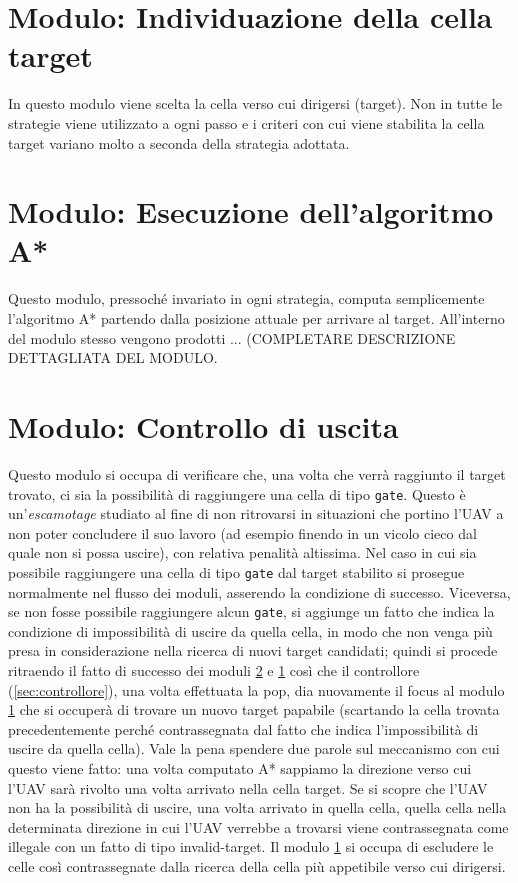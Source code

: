 \section{Modulo: Individuazione della cella target} \label{sec:target}
In questo modulo viene scelta la cella verso cui dirigersi (target). {\color{red} Non in tutte le strategie viene utilizzato a ogni passo} e i criteri con cui viene stabilita la cella target variano molto a seconda della strategia adottata.

\section{Modulo: Esecuzione dell'algoritmo A*} \label{sec:astar}
Questo modulo, {\color{red}pressoché invariato in ogni strategia}, computa semplicemente l'algoritmo A* partendo dalla posizione attuale per arrivare al target. All'interno del modulo stesso vengono prodotti {\color{red} ... (COMPLETARE DESCRIZIONE DETTAGLIATA DEL MODULO}.

\section{Modulo: Controllo di uscita} \label{sec:uscita}
Questo modulo si occupa di verificare che, una volta che verrà raggiunto il target trovato, ci sia la possibilità di raggiungere una cella di tipo \texttt{gate}. Questo è un'\emph{escamotage} studiato al fine di non ritrovarsi in situazioni che portino l'UAV a non poter concludere il suo lavoro (ad esempio finendo in un vicolo cieco dal quale non si possa uscire), con relativa penalità altissima.
Nel caso in cui sia possibile raggiungere una cella di tipo \texttt{gate} dal target stabilito si prosegue normalmente nel flusso dei moduli, asserendo la condizione di successo. Viceversa, se non fosse possibile raggiungere alcun \texttt{gate}, si aggiunge un fatto che indica la condizione di impossibilità di uscire da quella cella, in modo che non venga più presa in considerazione nella ricerca di nuovi target candidati; quindi si procede ritraendo il fatto di successo dei moduli \ref{sec:astar} e \ref{sec:target} così che il controllore (\ref{sec:controllore}), una volta effettuata la pop, dia nuovamente il focus al modulo \ref{sec:target} che si occuperà di trovare un nuovo target papabile (scartando la cella trovata precedentemente perché contrassegnata dal fatto che indica l'impossibilità di uscire da quella cella). Vale la pena spendere due parole sul meccanismo con cui questo viene fatto: una volta computato A* sappiamo la direzione verso cui l'UAV sarà rivolto una volta arrivato nella cella target. Se si scopre che l'UAV non ha la possibilità di uscire, una volta arrivato in quella cella, quella cella nella determinata direzione in cui l'UAV verrebbe a trovarsi viene contrassegnata come illegale con un fatto di tipo invalid-target. Il modulo \ref{sec:target} si occupa di escludere le celle così contrassegnate dalla ricerca della cella più appetibile verso cui dirigersi.

